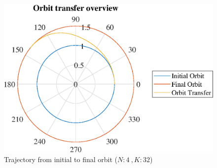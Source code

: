 \documentclass[]{article}
\begin{document}
	\begin{figure}
		\centering
		\includegraphics[scale=0.75]{orbit_N4_K32_C3_tf.eps}
		\caption{Trajectory from initial to final orbit (\(N:4\ , K:32\))}
		\label{fig:orbit_N4_K32_C3_tf}
	\end{figure}

	\FloatBarrier
\end{document}
